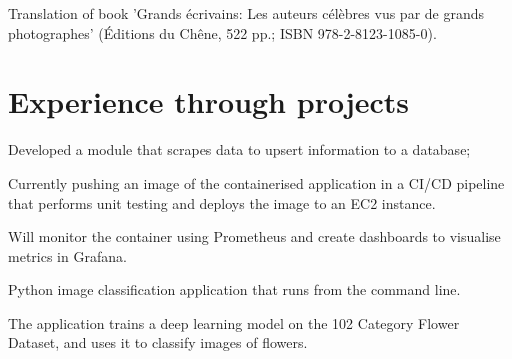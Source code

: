 \documentclass[]{plushcv}
\begin{document}
\begin{minipage}[t]{0.70\textwidth}
Translation of book 'Grands écrivains: Les auteurs célèbres vus par de grands photographes' (Éditions du Chêne, 522 pp.; ISBN 978-2-8123-1085-0).
\sectionsep



\section{Experience through projects}

\begin{tightemize}
\item Developed a module that scrapes data to upsert information to a database;
\item Currently pushing an image of the containerised application in a CI/CD pipeline that performs unit testing and deploys the image to an EC2 instance.
\item Will monitor the container using Prometheus and create dashboards to visualise metrics in Grafana.
\end{tightemize}
\sectionsep


\begin{tightemize}
\item Python image classification application that runs from the command line. 
\item The application trains a deep learning model on the 102 Category Flower Dataset, and uses it to classify images of flowers.
\end{tightemize}
\sectionsep


\end{minipage}
\end{document}
